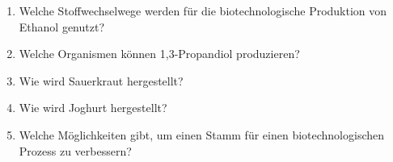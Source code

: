 \begin{enumerate}
	\item Welche Stoffwechselwege werden für die biotechnologische Produktion von Ethanol genutzt?
	\item Welche Organismen können 1,3-Propandiol produzieren?
	\item Wie wird Sauerkraut hergestellt?
	\item Wie wird Joghurt hergestellt?
	\item Welche Möglichkeiten gibt, um einen Stamm für einen biotechnologischen Prozess zu verbessern?
\end{enumerate}
